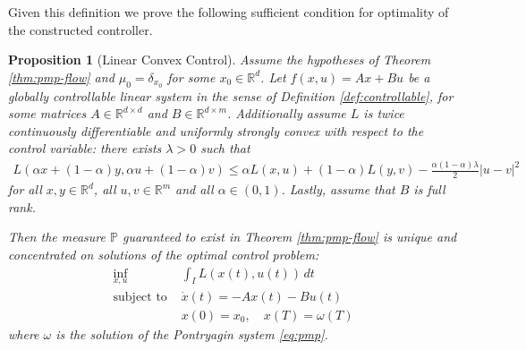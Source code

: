 \documentclass{article}
\newtheorem{proposition}[theorem]{Proposition}
\newcommand{\Rd}{\mathbb{R}^d}
\begin{document}
Given this definition we prove the following sufficient condition for optimality of the constructed controller.

\begin{proposition}[Linear Convex Control]
\label{prop:linear-convex}
Assume the hypotheses of Theorem \ref{thm:pmp-flow} and $\mu_0 = \delta_{x_0}$ for some $x_0 \in \Rd$. Let $f(x,u) = Ax + Bu$ be a globally controllable linear system in the sense of Definition \ref{def:controllable}, for some matrices $A \in \mathbb{R}^{d \times d}$ and $B \in \mathbb{R}^{d \times m}$. Additionally assume $L$ is twice continuously differentiable and uniformly strongly convex with respect to the control variable: there exists $\lambda > 0$ such that 
\begin{align}
L(\alpha x + (1-\alpha)y, \alpha u + (1-\alpha)v) \leq \alpha L(x,u) + (1-\alpha)L(y,v) - \frac{\alpha(1-\alpha)\lambda}{2}|u-v|^2
\end{align}
for all $x,y \in \mathbb{R}^d$, all $u,v \in \mathbb{R}^m$ and all $\alpha \in (0,1)$. Lastly, assume that $B$ is full rank. 

Then the measure $\mathbb{P}$ guaranteed to exist in Theorem \ref{thm:pmp-flow} is unique and concentrated on solutions of the optimal control problem:
\begin{align}
\label{eq:linear-opt}
\inf_{x,u} &\int_I L(x(t),u(t)) \, dt \\
\text{subject to } &\dot{x}(t) = -Ax(t) - Bu(t) \nonumber \\
&x(0) = x_0, \quad x(T) = \omega(T) \nonumber
\end{align}
where $\omega$ is the solution of the Pontryagin system \eqref{eq:pmp}.
\end{proposition}
\end{document}
